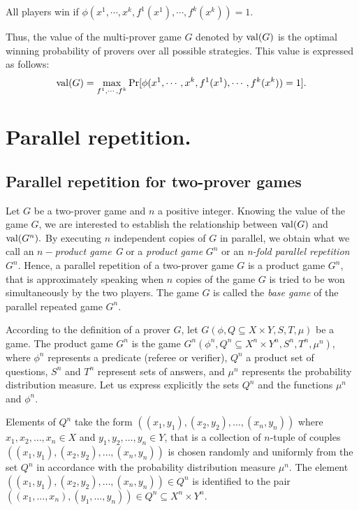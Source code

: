 All players win if $\phi (x^1, \cdots , x^k, f^1(x^1), \cdots , f^k(x^k))=1.$ 

Thus, the value of the multi-prover game $G$ denoted by $\mathrm{val} (G)$ is  the optimal winning probability of provers over all possible strategies. This value is expressed as follows:
$$\mathrm{val} (G)= \max_{f^1, \cdots , f^k} \Pr[\phi (x^1, \cdots , x^k, f^1(x^1), \cdots , f^k(x^k))=1].$$



\section{Parallel repetition.}

\subsection{Parallel repetition for  two-prover games} \label{prtp}

Let $G$ be a two-prover game and $n$ a positive integer. Knowing the value of the game $G$, we are interested 
to establish the relationship between $\mathrm{val} (G)$ and $\mathrm{val} (G^n).$  By executing  $n$ independent copies of $G$ in parallel, we obtain what we call an $n-$\textit{product game G} or a \textit{product game} $G^n$ or an \textit{n-fold parallel repetition} $G^n.$ Hence, a parallel repetition of a two-prover game $G$ is a product game $G^n$, that is approximately
speaking when $n$ copies of the game $G$ is tried to be won simultaneously by the two players. The game $G$ is called  the \textit{base game} of the parallel repeated game $G^n.$

According to the definition of a prover $G$, let $G(\phi, Q \subseteq X \times Y, S, T, \mu)$ be a game. The product game $G^n$ is the game $G^n(\phi^n, Q^n\subseteq X^n \times Y^n, S^n, T^n, \mu^n)$, where $\phi^n$ represents a predicate (referee or verifier), $Q^n$ a product set of questions, $S^n$ and $T^n$ represent sets of answers, and $\mu^n$ represents the probability distribution measure. Let us express explicitly the sets $Q^n$ and the functions $\mu^n$ and $\phi^n.$

 Elements of $Q^n$ take the form $((x_1, y_1),(x_2,y_2 ), \ldots, (x_n, y_n))$ where $x_1, x_2, \ldots, x_n \in X$ and $y_1, y_2, \ldots, y_n \in Y$, that is a collection of $n$-tuple of couples  $((x_1, y_1),(x_2,y_2 ), \ldots, (x_n, y_n))$ is chosen randomly and uniformly from the set $Q^n$ in accordance with the probability distribution measure $\mu^n $. The element  $((x_1, y_1),(x_2,y_2 ), \ldots, (x_n, y_n)) \in Q^n$ is  identified to the pair $((x_1,\ldots, x_n), (y_1, \ldots, y_n)) \in Q^n \subseteq X^n \times Y^n.$
 
